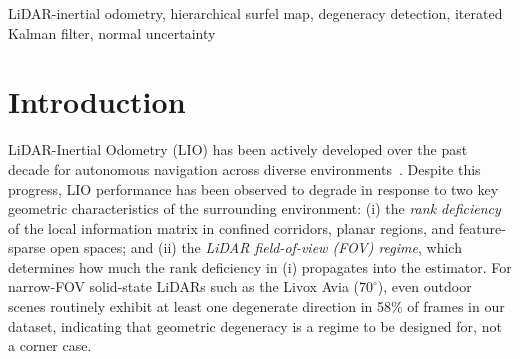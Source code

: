 \documentclass[conference]{IEEEtran}
\begin{document}
\begin{abstract}
Mid-360) over 35 unique trajectories, recorded as 43 sensor-bag pairs
(8 indoor trajectories carry both Avia and Mid-360 recordings). On the
35 baseline-comparable bags, HD-LIO achieves \SI{0.203}{\meter} uniform
per-bag mean ATE---the lowest mean on each of the four dataset
groups---and, on the additional 8~indoor Avia bags (70\textdegree{} FOV)
where all six evaluated baselines diverge ($\mathrm{ATE}{>}\SI{10}{\meter}$),
HD-LIO is the only method among the evaluated baselines to maintain
bounded error. Ablation reveals
FOV-dependent activity: degeneracy feedback dominates under narrow
FOV ($+$53\% with removal), is largely dormant under 360\textdegree{}
($\le 1$\% impact), and the surfel map prevents divergence under
severe occlusion ($+$185\% mean ablation, driven by a single
Mid-360 outlier); the proposed FOV-adaptive framework
handles this regime separation without per-scene reconfiguration.
\end{abstract}

\begin{IEEEkeywords}
LiDAR-inertial odometry, hierarchical surfel map, degeneracy detection,
iterated Kalman filter, normal uncertainty
\end{IEEEkeywords}

\section{Introduction}\label{sec:intro}

LiDAR-Inertial Odometry (LIO) has been actively developed over the past
decade for autonomous navigation across diverse
environments~\cite{xu2021fastlio,xu2022fastlio2,bai2022fasterlio,
chen2024iglio,he2023pointlio,shan2020liosam,chen2023dlio}. Despite
this progress, LIO performance has been observed to degrade in response
to two key geometric characteristics of the surrounding environment:
(i) the \emph{rank deficiency} of the local information matrix in
confined corridors, planar regions, and feature-sparse open spaces; and
(ii) the \emph{LiDAR field-of-view (FOV) regime}, which determines how
much the rank deficiency in (i) propagates into the estimator. For
narrow-FOV solid-state LiDARs such as the Livox Avia ($70^\circ$),
even outdoor scenes routinely exhibit at least one degenerate direction
in 58\% of frames in our dataset, indicating that geometric degeneracy
is a regime to be designed for, not a corner case.
\end{document}
